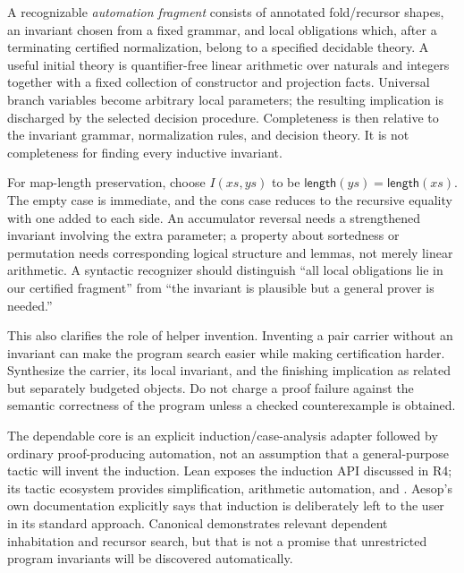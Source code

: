 A recognizable \emph{automation fragment} consists of annotated fold/recursor shapes, an invariant chosen from a fixed grammar, and local obligations which, after a terminating certified normalization, belong to a specified decidable theory. A useful initial theory is quantifier-free linear arithmetic over naturals and integers together with a fixed collection of constructor and projection facts. Universal branch variables become arbitrary local parameters; the resulting implication is discharged by the selected decision procedure. Completeness is then relative to the invariant grammar, normalization rules, and decision theory. It is not completeness for finding every inductive invariant.

For map-length preservation, choose $I(xs,ys)$ to be $\mathsf{length}(ys)=\mathsf{length}(xs)$. The empty case is immediate, and the cons case reduces to the recursive equality with one added to each side. An accumulator reversal needs a strengthened invariant involving the extra parameter; a property about sortedness or permutation needs corresponding logical structure and lemmas, not merely linear arithmetic. A syntactic recognizer should distinguish ``all local obligations lie in our certified fragment'' from ``the invariant is plausible but a general prover is needed.''

This also clarifies the role of helper invention. Inventing a pair carrier without an invariant can make the program search easier while making certification harder. Synthesize the carrier, its local invariant, and the finishing implication as related but separately budgeted objects. Do not charge a proof failure against the semantic correctness of the program unless a checked counterexample is obtained.


\answer The dependable core is an explicit induction/case-analysis adapter followed by ordinary proof-producing automation, not an assumption that a general-purpose tactic will invent the induction. Lean exposes the induction API discussed in R4; its tactic ecosystem provides simplification, arithmetic automation, and . Aesop's own documentation explicitly says that induction is deliberately left to the user in its standard approach. Canonical demonstrates relevant dependent inhabitation and recursor search, but that is not a promise that unrestricted program invariants will be discovered automatically.\cite{leaninduction,leanmanual,grind,aesop,canonical}

